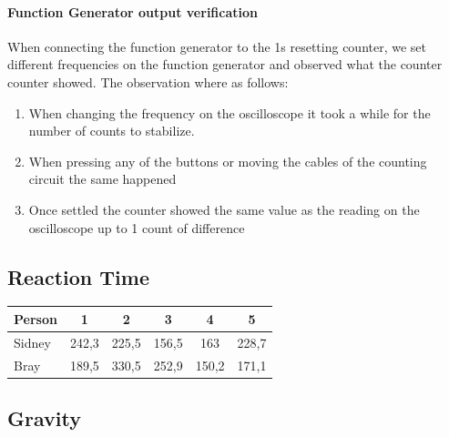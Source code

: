 \documentclass[fleqn,11pt]{article}
\begin{document}
\paragraph{Function Generator output verification}
When connecting the function generator to the 1s resetting counter, we set different frequencies on
the function generator and observed what the counter counter showed. The observation where as follows:

\begin{enumerate}
  \item When changing the frequency on the oscilloscope it took a while for the number of counts to
  stabilize.
  \item When pressing any of the buttons or moving the cables of the counting circuit the same happened
  \item Once settled the counter showed the same value as the reading on the oscilloscope up to 1 count
  of difference
\end{enumerate}

\subsection{Reaction Time}

\vspace{0.5cm}
\begin{tabular}{lccccc}
  Person & 1 & 2 & 3 & 4 & 5\\
  \midrule
  Sidney & 242,3 & 225,5 & 156,5 & 163 & 228,7\\
  Bray & 189,5 & 330,5 & 252,9 & 150,2 & 171,1\\
\end{tabular}
\vspace{0.5cm}

\subsection{Gravity}
\end{document}
